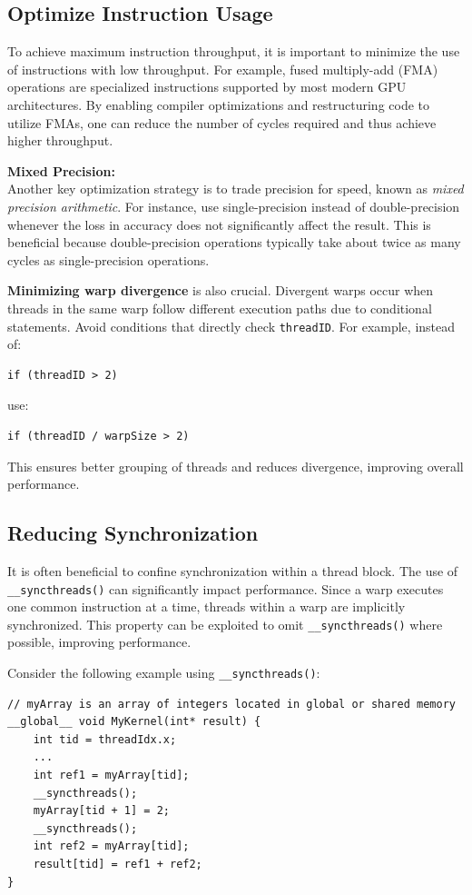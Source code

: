 \documentclass[12pt]{book}
\begin{document}
\subsection{Optimize Instruction Usage}
To achieve maximum instruction throughput, it is important to minimize the use of instructions with low throughput. For example, fused multiply-add (FMA) operations are specialized instructions supported by most modern GPU architectures. By enabling compiler optimizations and restructuring code to utilize FMAs, one can reduce the number of cycles required and thus achieve higher throughput.

\textbf{Mixed Precision:}\\
Another key optimization strategy is to trade precision for speed, known as \emph{mixed precision arithmetic}. For instance, use single-precision instead of double-precision whenever the loss in accuracy does not significantly affect the result. This is beneficial because double-precision operations typically take about twice as many cycles as single-precision operations.

\textbf{Minimizing warp divergence} is also crucial. Divergent warps occur when threads in the same warp follow different execution paths due to conditional statements. Avoid conditions that directly check \texttt{threadID}. For example, instead of:
\begin{verbatim}
if (threadID > 2)
\end{verbatim}
use:
\begin{verbatim}
if (threadID / warpSize > 2)
\end{verbatim}
This ensures better grouping of threads and reduces divergence, improving overall performance.

\subsection*{Reducing Synchronization}
It is often beneficial to confine synchronization within a thread block. The use of \texttt{\_\_syncthreads()} can significantly impact performance. Since a warp executes one common instruction at a time, threads within a warp are implicitly synchronized. This property can be exploited to omit \texttt{\_\_syncthreads()} where possible, improving performance.

Consider the following example using \texttt{\_\_syncthreads()}:
\begin{lstlisting}[style=cppstyle]
// myArray is an array of integers located in global or shared memory
__global__ void MyKernel(int* result) {   
    int tid = threadIdx.x;
    ...
    int ref1 = myArray[tid];
    __syncthreads();
    myArray[tid + 1] = 2;
    __syncthreads();
    int ref2 = myArray[tid];
    result[tid] = ref1 + ref2;
}
\end{lstlisting}
\end{document}
